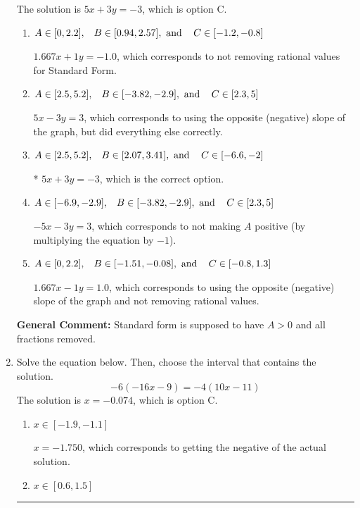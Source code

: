\documentclass{extbook}[14pt]
\newcommand{\litem}[1]{\item #1

\rule{\textwidth}{0.4pt}}
\begin{document}
\begin{enumerate}
{The solution is \( 5x + 3y = -3 \), which is option C.\begin{enumerate}[label=\Alph*.]
\item \( A \in [0, 2.2], \hspace{3mm} B \in [0.94, 2.57], \text{ and } \hspace{3mm} C \in [-1.2, -0.8] \)

 $1.667x + 1y = -1.0$, which corresponds to not removing rational values for Standard Form.
\item \( A \in [2.5, 5.2], \hspace{3mm} B \in [-3.82, -2.9], \text{ and } \hspace{3mm} C \in [2.3, 5] \)

 $5x - 3y = 3$, which corresponds to using the opposite (negative) slope of the graph, but did everything else correctly.
\item \( A \in [2.5, 5.2], \hspace{3mm} B \in [2.07, 3.41], \text{ and } \hspace{3mm} C \in [-6.6, -2] \)

* $5x + 3y = -3$, which is the correct option.
\item \( A \in [-6.9, -2.9], \hspace{3mm} B \in [-3.82, -2.9], \text{ and } \hspace{3mm} C \in [2.3, 5] \)

 $-5x - 3y = 3$, which corresponds to not making $A$ positive (by multiplying the equation by $-1$).
\item \( A \in [0, 2.2], \hspace{3mm} B \in [-1.51, -0.08], \text{ and } \hspace{3mm} C \in [-0.8, 1.3] \)

 $1.667x - 1y = 1.0$, which corresponds to using the opposite (negative) slope of the graph and not removing rational values.
\end{enumerate}

\textbf{General Comment:} Standard form is supposed to have $A > 0$ and all fractions removed.
}
\litem{
Solve the equation below. Then, choose the interval that contains the solution.
\[ -6(-16x -9) = -4(10x -11) \]The solution is \( x = -0.074 \), which is option C.\begin{enumerate}[label=\Alph*.]
\item \( x \in [-1.9, -1.1] \)

$x = -1.750$, which corresponds to getting the negative of the actual solution.
\item \( x \in [0.6, 1.5] \)


\end{enumerate}}
\end{enumerate}
\end{document}
